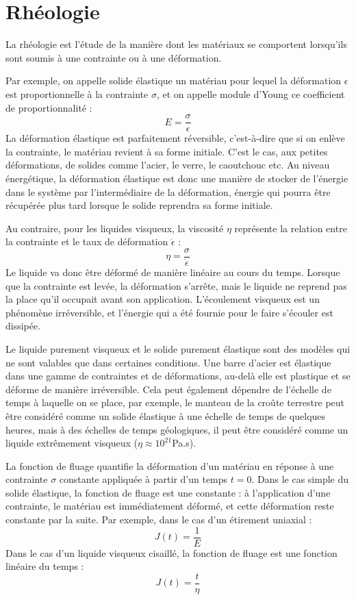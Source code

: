 \section{Rhéologie}

La rhéologie est l'étude de la manière dont les matériaux se comportent lorsqu'ils sont soumis à une contrainte ou à une déformation. 

Par exemple, on appelle solide élastique un matériau pour lequel la déformation $\epsilon$ est proportionnelle à la contrainte $ \sigma$, et on appelle module d'Young ce coefficient de proportionnalité : 
$$ E = \frac{\sigma}{\epsilon}$$
La déformation élastique est parfaitement réversible, c'est-à-dire que si on enlève la contrainte, le matériau revient à sa forme initiale. C'est le cas, aux petites déformations, de solides comme l'acier, le verre, le caoutchouc etc. Au niveau énergétique, la déformation élastique est donc une manière de stocker de l'énergie dans le système par l'intermédiaire de la déformation, énergie qui pourra être récupérée plus tard lorsque le solide reprendra sa forme initiale. 

Au contraire, pour les liquides visqueux, la viscosité $\eta$ représente la relation entre la contrainte et le taux de déformation $\dot{\epsilon}$ : 
$$ \eta=\frac{\sigma}{\dot{\epsilon}}$$
Le liquide va donc être déformé de manière linéaire au cours du temps. Lorsque que la contrainte est levée, la déformation s'arrête, mais le liquide ne reprend pas la place qu'il occupait avant son application. 
L'écoulement visqueux est un phénomène irréversible, et l'énergie qui a été fournie pour le faire s'écouler est dissipée. 

Le liquide purement visqueux et le solide purement élastique sont des modèles qui ne sont valables que dans certaines conditions. Une barre d'acier est élastique dans une gamme de contraintes et de déformations, au-delà elle est plastique et se déforme de manière irréversible. Cela peut également dépendre de l'échelle de temps à laquelle on se place, par exemple, le manteau de la croûte terrestre peut être considéré comme un solide élastique à une échelle de temps de quelques heures, mais à des échelles de temps géologiques, il peut être considéré comme un liquide extrêmement visqueux ($\eta \approx 10^{21}$Pa.s). 


La fonction de fluage quantifie la déformation d'un matériau en réponse à une contrainte $\sigma$ constante appliquée à partir d'un temps $t=0$. 
Dans le cas simple du solide élastique, la fonction de fluage est une constante : à l'application d'une contrainte, le matériau est immédiatement déformé, et cette déformation reste constante par la suite. Par exemple, dans le cas d'un étirement uniaxial : 
$$J(t)=\frac{1}{E}$$
Dans le cas d'un liquide visqueux cisaillé, la fonction de fluage est une fonction linéaire du temps : 
$$ J(t)=\frac{t}{\eta}$$

